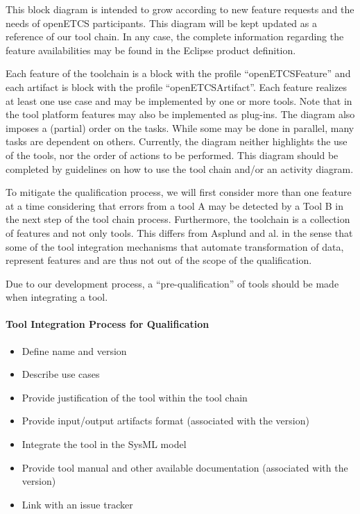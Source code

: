 This block diagram is intended to grow according to new feature requests and the
needs of openETCS participants.  This diagram will be kept updated
as a reference of our tool chain. In any case, the complete information
regarding the feature availabilities  may be found in the Eclipse product
definition.

Each feature of the toolchain is a block with the profile ``openETCSFeature''
and  each artifact is block with the profile ``openETCSArtifact''.  Each
feature realizes at least one use case and may be implemented by one or more tools.
Note that in the tool platform features  may also be
implemented as plug-ins. The diagram also imposes a (partial) order
on the tasks. While some may be done in parallel, many tasks are dependent on others.
Currently, the diagram neither highlights the use of the tools, nor the order of actions
to be performed. This diagram should be completed by guidelines on
how to use the tool chain and/or an activity diagram.

To mitigate the qualification process, we will first consider more
than one feature at a time considering that errors from a tool A may
be detected by a Tool B in the next step of the tool chain process.
Furthermore, the toolchain is a collection
of features and not only tools. This differs from Asplund and al. in the sense that
some of the tool integration mechanisms that automate transformation of data, represent features
 and are thus not out of the scope of the qualification.

Due to our development process, a ``pre-qualification'' of tools should be made
when integrating a tool.

\paragraph{Tool Integration Process for Qualification}

\begin{itemize}
\item Define name and version
\item Describe use cases
\item Provide justification of the tool within the tool chain
\item Provide input/output artifacts format (associated with the
  version)
\item Integrate the tool in the SysML model
\item Provide tool manual and other available documentation (associated with the version)
\item Link with an issue tracker
\end{itemize}

